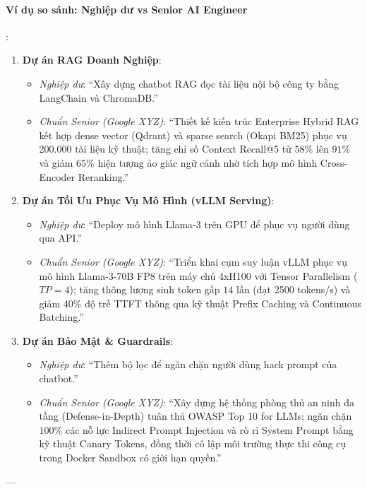 \paragraph{Ví dụ so sánh: Nghiệp dư vs Senior AI Engineer}:
\begin{enumerate}
  \item \textbf{Dự án RAG Doanh Nghiệp}:
  \begin{itemize}
    \item \textit{Nghiệp dư}: ``Xây dựng chatbot RAG đọc tài liệu nội bộ công ty bằng LangChain và ChromaDB.''
    \item \textit{Chuẩn Senior (Google XYZ)}: ``Thiết kế kiến trúc Enterprise Hybrid RAG kết hợp dense vector (Qdrant) và sparse search (Okapi BM25) phục vụ 200.000 tài liệu kỹ thuật; tăng chỉ số Context Recall@5 từ $58\%$ lên $91\%$ và giảm $65\%$ hiện tượng ảo giác ngữ cảnh nhờ tích hợp mô hình Cross-Encoder Reranking.''
  \end{itemize}

  \item \textbf{Dự án Tối Ưu Phục Vụ Mô Hình (vLLM Serving)}:
  \begin{itemize}
    \item \textit{Nghiệp dư}: ``Deploy mô hình Llama-3 trên GPU để phục vụ người dùng qua API.''
    \item \textit{Chuẩn Senior (Google XYZ)}: ``Triển khai cụm suy luận vLLM phục vụ mô hình Llama-3-70B FP8 trên máy chủ 4xH100 với Tensor Parallelism ($TP=4$); tăng thông lượng sinh token gấp $14$ lần (đạt 2500 tokens/s) và giảm $40\%$ độ trễ TTFT thông qua kỹ thuật Prefix Caching và Continuous Batching.''
  \end{itemize}

  \item \textbf{Dự án Bảo Mật \& Guardrails}:
  \begin{itemize}
    \item \textit{Nghiệp dư}: ``Thêm bộ lọc để ngăn chặn người dùng hack prompt của chatbot.''
    \item \textit{Chuẩn Senior (Google XYZ)}: ``Xây dựng hệ thống phòng thủ an ninh đa tầng (Defense-in-Depth) tuân thủ OWASP Top 10 for LLMs; ngăn chặn $100\%$ các nỗ lực Indirect Prompt Injection và rò rỉ System Prompt bằng kỹ thuật Canary Tokens, đồng thời cô lập môi trường thực thi công cụ trong Docker Sandbox có giới hạn quyền.''
  \end{itemize}
\end{enumerate}

---

